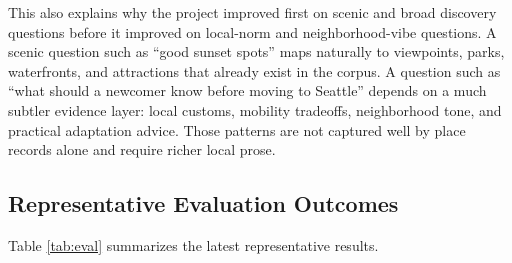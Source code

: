 \documentclass[11pt]{article}
\begin{document}
This also explains why the project improved first on scenic and broad discovery questions before it improved on local-norm and neighborhood-vibe questions. A scenic question such as ``good sunset spots'' maps naturally to viewpoints, parks, waterfronts, and attractions that already exist in the corpus. A question such as ``what should a newcomer know before moving to Seattle'' depends on a much subtler evidence layer: local customs, mobility tradeoffs, neighborhood tone, and practical adaptation advice. Those patterns are not captured well by place records alone and require richer local prose.

\subsection{Representative Evaluation Outcomes}
Table \ref{tab:eval} summarizes the latest representative results.
\end{document}
